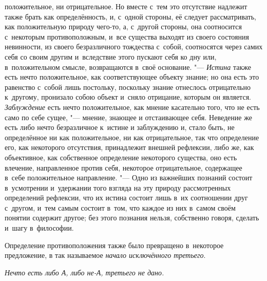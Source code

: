положительное, ни отрицательное. Но вместе с~тем это отсутствие надлежит
также брать как определённость, и, с~одной стороны, её следует
рассматривать, как положительную природу чего-то, а, с~другой стороны, она
соотносится с~некоторым противоположным, и~все существа выходят из своего
состояния невинности, из своего безразличного тождества с~собой,
соотносятся через самих себя со своим другим и~вследствие этого пускают
себя ко дну или, в~положительном смысле, возвращаются в~своё
основание. "--- {\em Истина} также есть нечто положительное, как
соответствующее объекту знание; но она есть это равенство с~собой лишь
постольку, поскольку знание отнеслось отрицательно к~другому, пронизало
собою объект и~сняло отрицание, которым он является.
{\em Заблуждение} есть нечто положительное, как мнение
касательно того, что не есть само по себе сущее, "--- мнение, знающее и
отстаивающее себя. Неведение же есть либо нечто безразличное к~истине и
заблуждению и, стало быть, не определённое ни как положительное, ни как
отрицательное, так что определение его, как некоторого отсутствия,
принадлежит внешней рефлексии, либо же, как объективное, как собственное
определение некоторого существа, оно есть влечение, направленное против
себя, некоторое отрицательное, содержащее в~себе положительное направление.
"--- Одно из важнейших познаний состоит в~усмотрении и~удержании того взгляда
на эту природу рассмотренных определений рефлексии, что их истина состоит
лишь в~их соотношении друг с~другом, и~тем самым состоит в~том, что каждое
из них в~самом своём понятии содержит другое; без этого познания нельзя,
собственно говоря, сделать и~шагу в~философии.


Определение противоположения также было превращено в~некоторое предложение,
в так называемое {\em начало исключённого третьего}.

{\em Нечто есть либо А, либо не-А, третьего не дано.}

